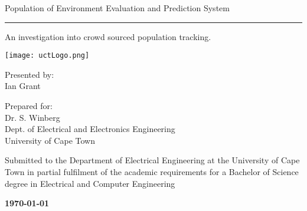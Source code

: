  



 
\thispagestyle{empty}
{\Huge \begin{center}

Population of Environment Evaluation and Prediction System
\hrule 
{\Large An investigation into crowd sourced population tracking.}
\end{center}}

\vskip 5mm
\begin{center}
\texttt{[image: uctLogo.png]}
\end{center}

\vskip 5mm
\begin{center}
Presented by:\\
Ian Grant		
\end{center}

\vskip 10mm
\begin{center}
Prepared for:\\
Dr. S. Winberg\\ 		
Dept. of Electrical and Electronics Engineering\\University of Cape Town
\end{center}


\vskip 10mm
\begin{center}
Submitted to the Department of Electrical Engineering at the University of Cape Town in partial
fulfilment of the academic requirements for a Bachelor of Science degree in Electrical and Computer Engineering

\end{center}


\vskip 5mm
\begin{center}{\bf \today}
\end{center}

\newpage
\thispagestyle{empty}
\mbox{}
\newpage

\onehalfspacing
\nohyphens{}
\thispagestyle{empty}
\vskip 40mm


\newpage
{}

\newpage

\newpage

\tableofcontents

\newpage
\listoffigures

\newpage
\listoftables


\newpage
\fancyhead[RE,LO]{}
\fancyhead[LE]{\leftmark}
\fancyhead[RO]{\rightmark}
\pagestyle{fancy}










% 

\appendix




